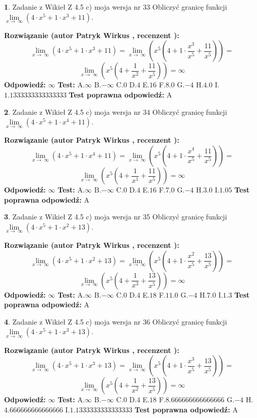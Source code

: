 \documentclass[12pt, a4paper]{article}
\theoremstyle{definition} %
\newtheorem{zad}{}
\newcommand{\zadStart}[1]{\begin{zad}#1\newline}
\newcommand{\zadStop}{\end{zad}}
\newcommand{\rozwStart}[2]{\noindent \textbf{Rozwiązanie (autor #1 , recenzent #2): }\newline}
\newcommand{\rozwStop}{\newline}
\newcommand{\odpStart}{\noindent \textbf{Odpowiedź:}\newline}
\newcommand{\odpStop}{\newline}
\newcommand{\testStart}{\noindent \textbf{Test:}\newline}
\newcommand{\testStop}{\newline}
\newcommand{\kluczStart}{\noindent \textbf{Test poprawna odpowiedź:}\newline}
\newcommand{\kluczStop}{\newline}
\begin{document}
\zadStart{Zadanie z Wikieł Z 4.5 c) moja wersja nr 33}
Obliczyć granicę funkcji  $\lim\limits_{x\to\ \infty}(4 \cdot x^{5}+1 \cdot x^{3}+11)$.
\zadStop
\rozwStart{Patryk Wirkus}{}
$$\lim\limits_{x\to\ \infty}(4 \cdot x^{5}+1 \cdot x^{3}+11) = \lim\limits_{x\to\ \infty}(x^{5}(4 +1 \cdot \frac{x^{3}}{x^{5}}+\frac{11}{x^{5}})) =$$ $$\lim\limits_{x\to\ \infty}(x^{5}(4 +\frac{1}{x^{2}}+\frac{11}{x^{5}})) =\infty$$
\rozwStop
\odpStart
$\infty$
\odpStop
\testStart
A.$\infty$ B.$-\infty$ C.$0$ D.$4$ E.$16$
F.$8.0$ G.$-4$
H.$4.0$
I.$1.1333333333333333$
\testStop
\kluczStart
A
\kluczStop



\zadStart{Zadanie z Wikieł Z 4.5 c) moja wersja nr 34}
Obliczyć granicę funkcji  $\lim\limits_{x\to\ \infty}(4 \cdot x^{5}+1 \cdot x^{4}+11)$.
\zadStop
\rozwStart{Patryk Wirkus}{}
$$\lim\limits_{x\to\ \infty}(4 \cdot x^{5}+1 \cdot x^{4}+11) = \lim\limits_{x\to\ \infty}(x^{5}(4 +1 \cdot \frac{x^{4}}{x^{5}}+\frac{11}{x^{5}})) =$$ $$\lim\limits_{x\to\ \infty}(x^{5}(4 +\frac{1}{x^{1}}+\frac{11}{x^{5}})) =\infty$$
\rozwStop
\odpStart
$\infty$
\odpStop
\testStart
A.$\infty$ B.$-\infty$ C.$0$ D.$4$ E.$16$
F.$7.0$ G.$-4$
H.$3.0$
I.$1.05$
\testStop
\kluczStart
A
\kluczStop



\zadStart{Zadanie z Wikieł Z 4.5 c) moja wersja nr 35}
Obliczyć granicę funkcji  $\lim\limits_{x\to\ \infty}(4 \cdot x^{5}+1 \cdot x^{2}+13)$.
\zadStop
\rozwStart{Patryk Wirkus}{}
$$\lim\limits_{x\to\ \infty}(4 \cdot x^{5}+1 \cdot x^{2}+13) = \lim\limits_{x\to\ \infty}(x^{5}(4 +1 \cdot \frac{x^{2}}{x^{5}}+\frac{13}{x^{5}})) =$$ $$\lim\limits_{x\to\ \infty}(x^{5}(4 +\frac{1}{x^{3}}+\frac{13}{x^{5}})) =\infty$$
\rozwStop
\odpStart
$\infty$
\odpStop
\testStart
A.$\infty$ B.$-\infty$ C.$0$ D.$4$ E.$18$
F.$11.0$ G.$-4$
H.$7.0$
I.$1.3$
\testStop
\kluczStart
A
\kluczStop



\zadStart{Zadanie z Wikieł Z 4.5 c) moja wersja nr 36}
Obliczyć granicę funkcji  $\lim\limits_{x\to\ \infty}(4 \cdot x^{5}+1 \cdot x^{3}+13)$.
\zadStop
\rozwStart{Patryk Wirkus}{}
$$\lim\limits_{x\to\ \infty}(4 \cdot x^{5}+1 \cdot x^{3}+13) = \lim\limits_{x\to\ \infty}(x^{5}(4 +1 \cdot \frac{x^{3}}{x^{5}}+\frac{13}{x^{5}})) =$$ $$\lim\limits_{x\to\ \infty}(x^{5}(4 +\frac{1}{x^{2}}+\frac{13}{x^{5}})) =\infty$$
\rozwStop
\odpStart
$\infty$
\odpStop
\testStart
A.$\infty$ B.$-\infty$ C.$0$ D.$4$ E.$18$
F.$8.666666666666666$ G.$-4$
H.$4.666666666666666$
I.$1.1333333333333333$
\testStop
\kluczStart
A
\kluczStop
\end{document}
